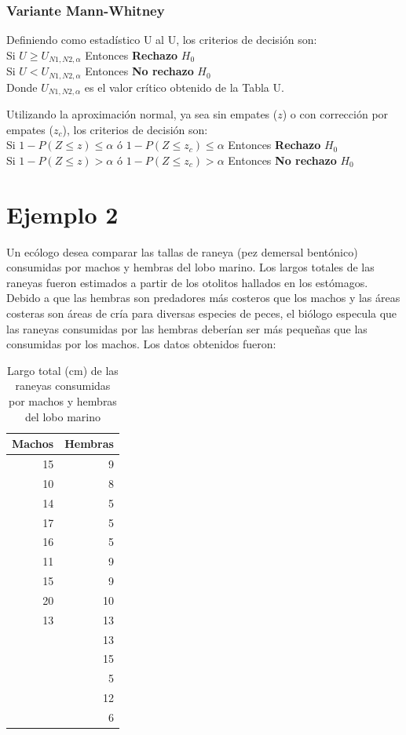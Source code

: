 \documentclass[]{book}
\theoremstyle{definition}
\theoremstyle{definition}
\theoremstyle{definition}
\theoremstyle{remark}
\begin{document}
\hypertarget{variante-mann-whitney-2}{%
\subsubsection{Variante Mann-Whitney}\label{variante-mann-whitney-2}}

Definiendo como estadístico U al U, los criterios de decisión son:\\
Si \(U≥U_{N1,N2,\alpha}\) Entonces \textbf{Rechazo} \(H_0\)\\
Si \(U<U_{N1,N2,\alpha}\) Entonces \textbf{No rechazo} \(H_0\)\\
Donde \(U_{N1,N2,\alpha}\) es el valor crítico obtenido de la Tabla U.

Utilizando la aproximación normal, ya sea sin empates (\(z\)) o con
corrección por empates (\(z_c\)), los criterios de decisión son:\\
Si \(1-P(Z≤z)≤\alpha\) ó \(1-P(Z≤z_c )≤\alpha\) Entonces
\textbf{Rechazo} \(H_0\)\\
Si \(1-P(Z≤z)>\alpha\) ó \(1-P(Z≤z_c )>\alpha\) Entonces \textbf{No
rechazo} \(H_0\)

\hypertarget{ejemplo-2}{%
\section{Ejemplo 2}\label{ejemplo-2}}

Un ecólogo desea comparar las tallas de raneya (pez demersal bentónico)
consumidas por machos y hembras del lobo marino. Los largos totales de
las raneyas fueron estimados a partir de los otolitos hallados en los
estómagos. Debido a que las hembras son predadores más costeros que los
machos y las áreas costeras son áreas de cría para diversas especies de
peces, el biólogo especula que las raneyas consumidas por las hembras
deberían ser más pequeñas que las consumidas por los machos. Los datos
obtenidos fueron:

\begin{table}

\caption{\label{tab:ejemplo-2-datos}Largo total (cm) de las
raneyas consumidas por machos y hembras del lobo marino}
\centering
\begin{tabular}[t]{r|r}
\hline
Machos & Hembras\\
\hline
15 & 9\\
\hline
10 & 8\\
\hline
14 & 5\\
\hline
17 & 5\\
\hline
16 & 5\\
\hline
11 & 9\\
\hline
15 & 9\\
\hline
20 & 10\\
\hline
13 & 13\\
\hline
 & 13\\
\hline
 & 15\\
\hline
 & 5\\
\hline
 & 12\\
\hline
 & 6\\
\hline
\end{tabular}
\end{table}
\end{document}
